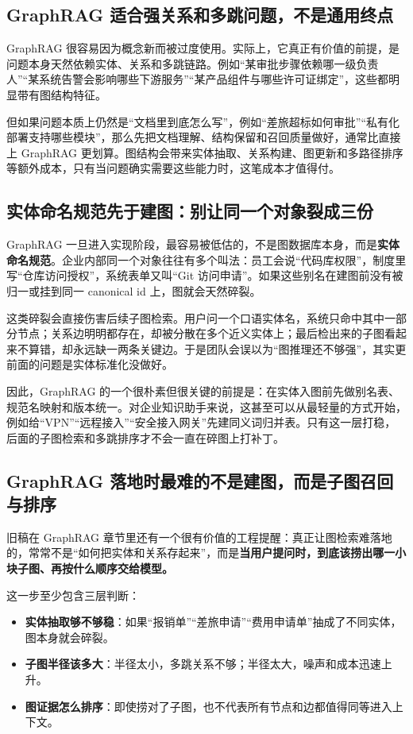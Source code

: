 \subsection{GraphRAG 适合强关系和多跳问题，不是通用终点}
GraphRAG 很容易因为概念新而被过度使用。实际上，它真正有价值的前提，是问题本身天然依赖实体、关系和多跳链路。例如“某审批步骤依赖哪一级负责人”“某系统告警会影响哪些下游服务”“某产品组件与哪些许可证绑定”，这些都明显带有图结构特征。

但如果问题本质上仍然是“文档里到底怎么写”，例如“差旅超标如何审批”“私有化部署支持哪些模块”，那么先把文档理解、结构保留和召回质量做好，通常比直接上 GraphRAG 更划算。图结构会带来实体抽取、关系构建、图更新和多路径排序等额外成本，只有当问题确实需要这些能力时，这笔成本才值得付。

\subsection{实体命名规范先于建图：别让同一个对象裂成三份}
GraphRAG 一旦进入实现阶段，最容易被低估的，不是图数据库本身，而是\textbf{实体命名规范}。企业内部同一个对象往往有多个叫法：员工会说“代码库权限”，制度里写“仓库访问授权”，系统表单又叫“Git 访问申请”。如果这些别名在建图前没有被归一或挂到同一 canonical id 上，图就会天然碎裂。

这类碎裂会直接伤害后续子图检索。用户问一个口语实体名，系统只命中其中一部分节点；关系边明明都存在，却被分散在多个近义实体上；最后检出来的子图看起来不算错，却永远缺一两条关键边。于是团队会误以为“图推理还不够强”，其实更前面的问题是实体标准化没做好。

因此，GraphRAG 的一个很朴素但很关键的前提是：在实体入图前先做别名表、规范名映射和版本统一。对企业知识助手来说，这甚至可以从最轻量的方式开始，例如给“VPN”“远程接入”“安全接入网关”先建同义词归并表。只有这一层打稳，后面的子图检索和多跳排序才不会一直在碎图上打补丁。

\subsection{GraphRAG 落地时最难的不是建图，而是子图召回与排序}
旧稿在 GraphRAG 章节里还有一个很有价值的工程提醒：真正让图检索难落地的，常常不是“如何把实体和关系存起来”，而是\textbf{当用户提问时，到底该捞出哪一小块子图、再按什么顺序交给模型。}

这一步至少包含三层判断：
\begin{itemize}
  \item \textbf{实体抽取够不够稳}：如果“报销单”“差旅申请”“费用申请单”抽成了不同实体，图本身就会碎裂。
  \item \textbf{子图半径该多大}：半径太小，多跳关系不够；半径太大，噪声和成本迅速上升。
  \item \textbf{图证据怎么排序}：即使捞对了子图，也不代表所有节点和边都值得同等进入上下文。
\end{itemize}

